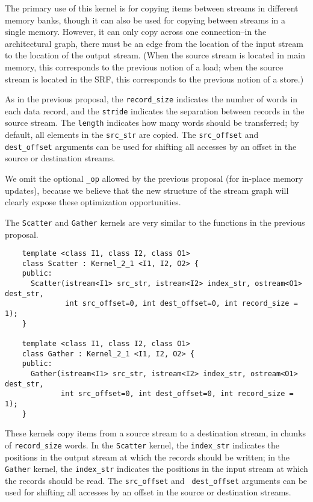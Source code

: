 The primary use of this kernel is for copying items between streams in
different memory banks, though it can also be used for copying between
streams in a single memory.  However, it can only copy across one
connection--in the architectural graph, there must be an edge from the
location of the input stream to the location of the output stream.
(When the source stream is located in main memory, this corresponds to
the previous notion of a load; when the source stream is located in
the SRF, this corresponds to the previous notion of a store.)

As in the previous proposal, the {\tt record\_size} indicates the
number of words in each data record, and the {\tt stride} indicates
the separation between records in the source stream.  The {\tt length}
indicates how many words should be transferred; by default, all
elements in the {\tt src\_str} are copied.  The {\tt src\_offset} and
{\tt dest\_offset} arguments can be used for shifting all accesses by
an offset in the source or destination streams.  

We omit the optional {\tt \_op} allowed by the previous proposal (for
in-place memory updates), because we believe that the new structure of
the stream graph will clearly expose these optimization opportunities.

 The {\tt Scatter} and {\tt Gather} kernels are
very similar to the functions in the previous proposal.
{\small
\begin{verbatim}
    template <class I1, class I2, class O1>
    class Scatter : Kernel_2_1 <I1, I2, O2> {
    public:
      Scatter(istream<I1> src_str, istream<I2> index_str, ostream<O1> dest_str, 
              int src_offset=0, int dest_offset=0, int record_size = 1);
    }

    template <class I1, class I2, class O1>
    class Gather : Kernel_2_1 <I1, I2, O2> {
    public:
      Gather(istream<I1> src_str, istream<I2> index_str, ostream<O1> dest_str, 
             int src_offset=0, int dest_offset=0, int record_size = 1);
    }  
\end{verbatim}}

These kernels copy items from a source stream to a destination stream,
in chunks of {\tt record\_size} words.  In the {\tt Scatter} kernel,
the {\tt index\_str} indicates the positions in the output stream at
which the records should be written; in the {\tt Gather} kernel, the
{\tt index\_str} indicates the positions in the input stream at which
the records should be read.  The {\tt src\_offset} and {\tt
dest\_offset} arguments can be used for shifting all accesses by an
offset in the source or destination streams.

